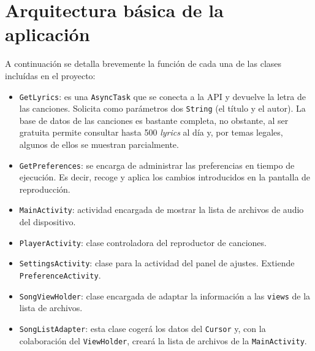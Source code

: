 \documentclass[10pt,a4paper]{article}
\begin{document}
\section{Arquitectura básica de la aplicación}
A continuación se detalla brevemente la función de cada una de las clases incluídas en el proyecto:
\begin{itemize}
\item \texttt{GetLyrics}: es una \texttt{AsyncTask} que se conecta a la API y devuelve la letra de las canciones. Solicita como parámetros dos \texttt{String} (el título y el autor). La base de datos de las canciones es bastante completa, no obstante, al ser gratuita permite consultar hasta 500 \textit{lyrics} al día y, por temas legales, algunos de ellos se muestran parcialmente.
\item \texttt{GetPreferences}: se encarga de administrar las preferencias en tiempo de ejecución. Es decir, recoge y aplica los cambios introducidos en la pantalla de reproducción.
\item \texttt{MainActivity}: actividad encargada de mostrar la lista de archivos de audio del dispositivo.
\item \texttt{PlayerActivity}: clase controladora del reproductor de canciones.
\item \texttt{SettingsActivity}: clase para la actividad del panel de ajustes. Extiende \texttt{PreferenceActivity}.
\item \texttt{SongViewHolder}: clase encargada de adaptar la información a las \texttt{views} de la lista de archivos.
\item \texttt{SongListAdapter}: esta clase cogerá los datos del \texttt{Cursor} y, con la colaboración del \texttt{ViewHolder}, creará la lista de archivos de la \texttt{MainActivity}.
\end{itemize}
\end{document}
